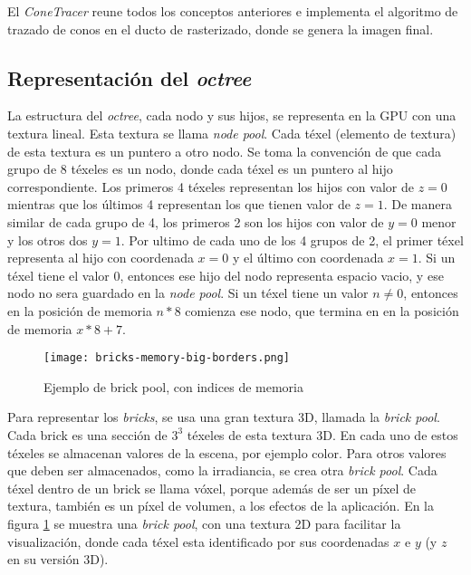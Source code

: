 El \textit{ConeTracer} reune todos los conceptos anteriores e implementa el algoritmo de trazado de conos en el ducto de rasterizado, donde se genera la imagen final.

\subsection{Representación del \textit{octree}}

La estructura del \textit{octree}, cada nodo y sus hijos, se representa en la GPU con una textura lineal.
Esta textura se llama \textit{node pool}.
Cada téxel (elemento de textura) de esta textura es un puntero a otro nodo.
Se toma la convención de que cada grupo de 8 téxeles es un nodo, donde cada téxel es un puntero al hijo correspondiente.
Los primeros 4 téxeles representan los hijos con valor de $z = 0$ mientras que los últimos 4 representan los que tienen valor de $z = 1$.
De manera similar de cada grupo de 4, los primeros 2 son los hijos con valor de $y = 0$ menor y los otros dos $y = 1$.
Por ultimo de cada uno de los 4 grupos de 2, el primer téxel representa al hijo con coordenada $x = 0$ y el último con coordenada $x = 1$.
Si un téxel tiene el valor $0$, entonces ese hijo del nodo representa espacio vacio, y ese nodo no sera guardado en la \textit{node pool}.
Si un téxel tiene un valor $n \not = 0$, entonces en la posición de memoria $n * 8$ comienza ese nodo, que termina en en la posición de memoria $x * 8 + 7$.

\begin{figure}[h!]
    \centering
    \texttt{[image: bricks-memory-big-borders.png]}
    \caption{Ejemplo de brick pool, con indices de memoria}
    \label{fig:brick_pool_example}
\end{figure}

Para representar los \textit{bricks}, se usa una gran textura 3D, llamada la \textit{brick pool}.
Cada brick es una sección de $3^3$ téxeles de esta textura 3D.
En cada uno de estos téxeles se almacenan valores de la escena, por ejemplo color.
Para otros valores que deben ser almacenados, como la irradiancia, se crea otra \textit{brick pool}.
Cada téxel dentro de un brick se llama vóxel, porque además de ser un píxel de textura, también es un píxel de volumen, a los efectos de la aplicación.
En la figura \ref{fig:brick_pool_example} se muestra una \textit{brick pool}, con una textura 2D para facilitar la visualización, donde cada téxel esta identificado por sus coordenadas $x$ e $y$ (y $z$ en su versión 3D).

